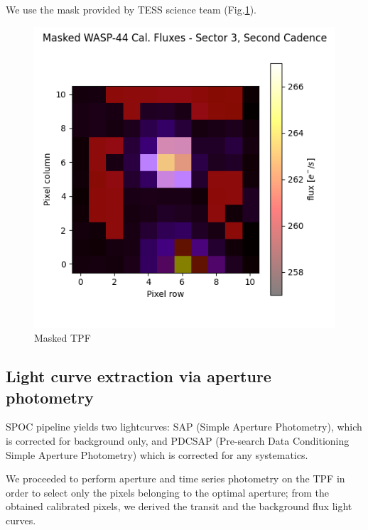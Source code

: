 \documentclass{aa}
\begin{document}
We use the mask provided by TESS science team (Fig.\ref{fig:masked_tpf}). 
\begin{figure}[h]
    \centering
    \includegraphics[scale=0.45, angle=0]{pictures/masked_tpf.png}
    \caption{Masked TPF}
    \label{fig:masked_tpf}
\end{figure}

\subsection{Light curve extraction via aperture photometry}
SPOC pipeline yields two lightcurves: SAP (Simple Aperture Photometry), which is corrected for background only, and PDCSAP (Pre-search Data Conditioning Simple Aperture Photometry) which is corrected for any systematics.

We proceeded to perform aperture and time series photometry on the TPF in order to select only the pixels belonging to the optimal aperture; from the obtained calibrated pixels, we derived the transit and the background flux light curves.
\end{document}
